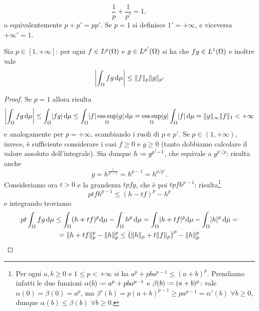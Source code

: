 \begin{equation}
    \frac1{p}+\frac1{p'}=1,
\end{equation}
o equivalentemente $p+p'=pp'$.
Se $p=1$ si definisce $1'=+\infty$, e viceversa $+\infty'=1$.
\begin{proprieta} \label{pr:disuguaglianza-holder}
    Sia $p\in[1,+\infty]$: per ogni $f\in\leb[p]{\Omega}$ e $g\in\leb[p']{\Omega}$ si ha che $fg\in\leb[1]{\Omega}$ e inoltre vale
    \begin{equation}
        \abs[\bigg]{\int_\Omega fg\,\dd\mu} \le \norm{f}_p\norm{g}_{p'}
        \label{eq:disuguaglianza-holder}
    \end{equation}
\end{proprieta}
\begin{proof}
    Se $p=1$ allora risulta
    \begin{equation}
        \abs[\bigg]{\int_\Omega fg\,\dd\mu}\le
        \int_\Omega\abs{fg}\,\dd\mu\le
        \int_\Omega\abs{f}\esssup_\Omega\abs{g}\,\dd\mu=
        \esssup_\Omega\abs{g}\int_\Omega\abs{f}\,\dd\mu=
        \norm{g}_\infty\norm{f}_1<+\infty
    \end{equation}
    e analogamente per $p=+\infty$, scambiando i ruoli di $p$ e $p'$.
    Se $p\in(1,+\infty)$, invece, è sufficiente considerare i casi $f\ge 0$ e $g\ge 0$ (tanto dobbiamo calcolare il valore assoluto dell'integrale).
    Sia dunque $h\defeq g^{p'-1}$, che equivale a $g^{p'/p}$: risulta anche
    \begin{equation}
        g=h^{\frac1{p'-1}}=h^{p-1}=h^{p/p'}.
    \end{equation}
    Consideriamo ora $t>0$ e la grandezza $tpfg$, che è poi $tpfh^{p-1}$: risulta\footnote{
        Per ogni $a,b\ge 0$ e $1\le p<+\infty$ si ha $a^p+pba^{p-1}\le(a+b)^p$.
        Prendiamo infatti le due funzioni $\alpha(b)\defeq a^p+pba^{p-1}$ e $\beta(b)\defeq (a+b)^p$: vale $\alpha(0)=\beta(0)=a^p$, ma $\beta'(b)=p(a+b)^{p-1}\ge pa^{p-1}=\alpha'(b)$ $\forall b\ge 0$, dunque $\alpha(b)\le\beta(b)$ $\forall b\ge 0$.
    }
    \begin{equation}
        ptfh^{p-1} \le (h-tf)^p-h^p
    \end{equation}
    e integrando troviamo
    \begin{multline}
        pt\int_\Omega fg\,\dd\mu\le
        \int_\Omega (h+tf)^p\dd\mu-\int_\Omega h^p\,\dd\mu=
        \int_\Omega \abs{h+tf}^p\dd\mu-\int_\Omega \abs{h}^p\,\dd\mu=\\=
        \norm{h+tf}_p^p-\norm{h}_p^p\le
        \bigl(\norm{h}_p+t\norm{f}_p\bigr)^p-\norm{h}_p^p

\end{multline}
\end{proof}
